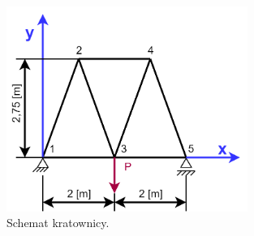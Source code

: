 \documentclass[12pt, a4papper, twoside]{article}
\begin{document}
\begin{figure}[H]
    \centering
    \includegraphics[width=0.7\textwidth, height=0.7\textwidth]{Kratownica.png}
    \caption{Schemat kratownicy.}
    \label{kratownica}
\end{figure}
\end{document}
